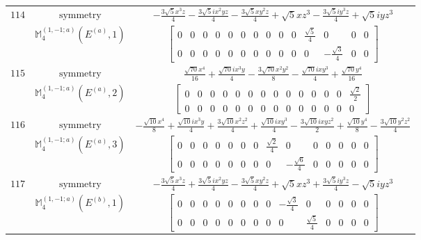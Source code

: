 \documentclass[fleqn,8pt,landscape]{jsarticle}
\begin{document}
\begin{longtable}{ccc}
$ 114 $ & $ \text{symmetry} $ & $ - \frac{3 \sqrt{5} x^{3} z}{4} - \frac{3 \sqrt{5} i x^{2} y z}{4} - \frac{3 \sqrt{5} x y^{2} z}{4} + \sqrt{5} x z^{3} - \frac{3 \sqrt{5} i y^{3} z}{4} + \sqrt{5} i y z^{3} $ \\
$  $ & $ \mathbb{M}_{4}^{(1,-1;a)}(E^{(a)},1) $ & $ \begin{bmatrix} 0 & 0 & 0 & 0 & 0 & 0 & 0 & 0 & 0 & 0 & \frac{\sqrt{5}}{4} & 0 & 0 & 0 \\ 0 & 0 & 0 & 0 & 0 & 0 & 0 & 0 & 0 & 0 & 0 & - \frac{\sqrt{3}}{4} & 0 & 0 \end{bmatrix} $ \\ \hline
$ 115 $ & $ \text{symmetry} $ & $ \frac{\sqrt{70} x^{4}}{16} + \frac{\sqrt{70} i x^{3} y}{4} - \frac{3 \sqrt{70} x^{2} y^{2}}{8} - \frac{\sqrt{70} i x y^{3}}{4} + \frac{\sqrt{70} y^{4}}{16} $ \\
$  $ & $ \mathbb{M}_{4}^{(1,-1;a)}(E^{(a)},2) $ & $ \begin{bmatrix} 0 & 0 & 0 & 0 & 0 & 0 & 0 & 0 & 0 & 0 & 0 & 0 & 0 & \frac{\sqrt{2}}{2} \\ 0 & 0 & 0 & 0 & 0 & 0 & 0 & 0 & 0 & 0 & 0 & 0 & 0 & 0 \end{bmatrix} $ \\ \hline
$ 116 $ & $ \text{symmetry} $ & $ - \frac{\sqrt{10} x^{4}}{8} + \frac{\sqrt{10} i x^{3} y}{4} + \frac{3 \sqrt{10} x^{2} z^{2}}{4} + \frac{\sqrt{10} i x y^{3}}{4} - \frac{3 \sqrt{10} i x y z^{2}}{2} + \frac{\sqrt{10} y^{4}}{8} - \frac{3 \sqrt{10} y^{2} z^{2}}{4} $ \\
$  $ & $ \mathbb{M}_{4}^{(1,-1;a)}(E^{(a)},3) $ & $ \begin{bmatrix} 0 & 0 & 0 & 0 & 0 & 0 & 0 & \frac{\sqrt{2}}{4} & 0 & 0 & 0 & 0 & 0 & 0 \\ 0 & 0 & 0 & 0 & 0 & 0 & 0 & 0 & - \frac{\sqrt{6}}{4} & 0 & 0 & 0 & 0 & 0 \end{bmatrix} $ \\ \hline
$ 117 $ & $ \text{symmetry} $ & $ - \frac{3 \sqrt{5} x^{3} z}{4} + \frac{3 \sqrt{5} i x^{2} y z}{4} - \frac{3 \sqrt{5} x y^{2} z}{4} + \sqrt{5} x z^{3} + \frac{3 \sqrt{5} i y^{3} z}{4} - \sqrt{5} i y z^{3} $ \\
$  $ & $ \mathbb{M}_{4}^{(1,-1;a)}(E^{(b)},1) $ & $ \begin{bmatrix} 0 & 0 & 0 & 0 & 0 & 0 & 0 & 0 & - \frac{\sqrt{3}}{4} & 0 & 0 & 0 & 0 & 0 \\ 0 & 0 & 0 & 0 & 0 & 0 & 0 & 0 & 0 & \frac{\sqrt{5}}{4} & 0 & 0 & 0 & 0 \end{bmatrix} $ \\ \hline

\end{longtable}
\end{document}

